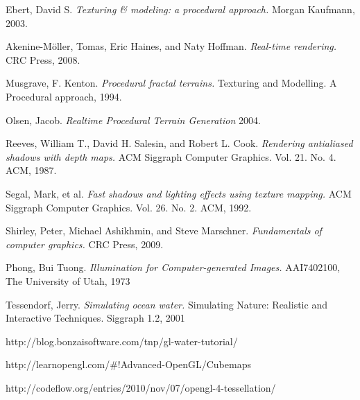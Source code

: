 \documentclass[11pt,a4paper]{article}
\begin{document}
\begin{thebibliography}{9}

  Ebert, David S. \emph{Texturing \& modeling: a procedural approach.} Morgan Kaufmann, 2003.

  Akenine-Möller, Tomas, Eric Haines, and Naty Hoffman. \emph{Real-time rendering.} CRC Press, 2008.

  Musgrave, F. Kenton. \emph{Procedural fractal terrains.} Texturing and Modelling. A Procedural approach, 1994.

  Olsen, Jacob. \emph{Realtime Procedural Terrain Generation} 2004.

  Reeves, William T., David H. Salesin, and Robert L. Cook. \emph{Rendering antialiased shadows with depth maps.} ACM Siggraph Computer Graphics. Vol. 21. No. 4. ACM, 1987.

  Segal, Mark, et al. \emph{Fast shadows and lighting effects using texture mapping.} ACM Siggraph Computer Graphics. Vol. 26. No. 2. ACM, 1992.

  Shirley, Peter, Michael Ashikhmin, and Steve Marschner. \emph{Fundamentals of computer graphics.} CRC Press, 2009.

  Phong, Bui Tuong. \emph{Illumination for Computer-generated Images.} AAI7402100, The University of Utah, 1973

  Tessendorf, Jerry. \emph{Simulating ocean water.} Simulating Nature: Realistic and Interactive Techniques. Siggraph 1.2, 2001

  http://blog.bonzaisoftware.com/tnp/gl-water-tutorial/

  http://learnopengl.com/\#!Advanced-OpenGL/Cubemaps

  http://codeflow.org/entries/2010/nov/07/opengl-4-tessellation/

\end{thebibliography}
\end{document}
